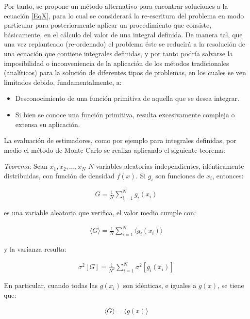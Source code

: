 Por tanto, se propone un m\'etodo alternativo para encontrar soluciones a la ecuaci\'on \ref{EqX}, para lo cual se considerar\'a la
re-escritura del problema en modo particular para posteriormente aplicar un procedimiento que consiste, b\'asicamente, en el c\'alculo
del valor de una integral definida.
%
De manera tal, que una vez replanteado (re-ordenado) el problema \'este se reducir\'a a la resoluci\'on de una ecuaci\'on que contiene
integrales definidas, y por tanto podr\'ia salvarse la imposibilidad o inconveniencia de la aplicaci\'on de
los m\'etodos tradicionales (anal\'iticos) para la soluci\'on de diferentes tipos de problemas, en los cuales se ven limitados debido,
fundamentalmente, a:
\begin{itemize}
 \item Desconocimiento de una funci\'on primitiva de aquella que se desea integrar.
 \item Si bien se conoce una funci\'on primitiva, resulta excesivamente compleja o extensa su aplicaci\'on.
\end{itemize}

La evaluaci\'on de estimadores, como por ejemplo para integrales definidas, por medio el m\'etodo de Monte Carlo se realiza aplicando el
siguiente teorema:

\textsl{Teorema:} Sean $x_{1}, x_{2}, ..., x_{N}$ $N$ variables aleatorias independientes, id\'enticamente distribuidas, con funci\'on
de densidad $f(x)$. Si $g_{i}$ son funciones de $x_{i}$, entonces:

\begin{eqnarray}
 	G = \frac{1}{N} \sum_{i=1}^{N} g_{i}(x_{i})
 \label{EqZZZ1}
\end{eqnarray}

es una variable aleatoria que verifica, el valor medio cumple con:

\begin{eqnarray}
 	\langle G \rangle = \frac{1}{N} \sum_{i=1}^{N} \langle g_{i}(x_{i}) \rangle
 \label{EqZZZ2}
\end{eqnarray}

y la varianza resulta:

\begin{eqnarray}
 	\sigma ^{2} [G] = \frac{1}{N^{2}} \sum_{i=1}^{N} \sigma ^{2} [g_{i}(x_{i})]
 \label{EqZZZ3}
\end{eqnarray}

En particular, cuando todas las $g(x_{i})$ son id\'enticas, e iguales a $g(x)$, se tiene que:

\begin{eqnarray}
 	\langle G \rangle = \langle g(x) \rangle
 \label{EqZZZ4}
\end{eqnarray}

